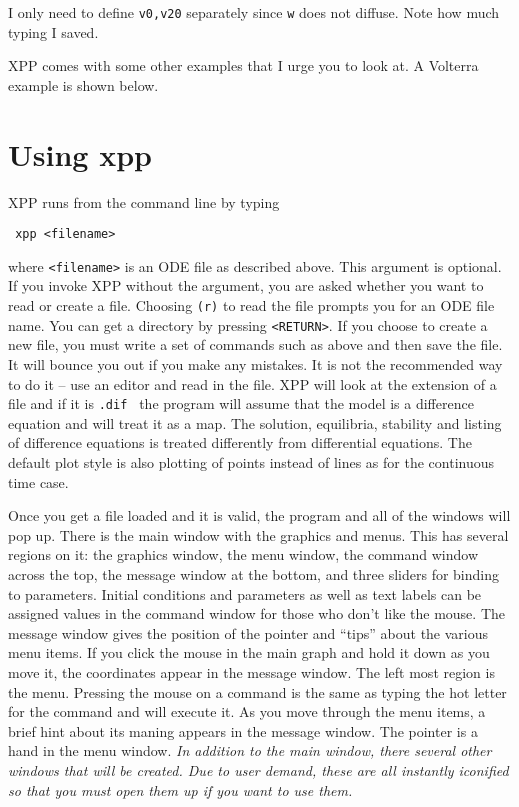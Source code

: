 \documentclass{article}
\newcommand{\bvb}{\begin{verbatim}}
\newcommand{\tc}[1]{\addcontentsline{toc}{subsection}{#1}}
\newcommand{\tcc}[1]{\addcontentsline{toc}{subsubsection}{#1}}
\begin{document}
I only need to define {\tt v0,v20} separately since {\tt w} does not diffuse.
Note how much typing I saved.  




\bigskip











 
  
XPP comes with some other examples that I urge you to look at. A
Volterra example is shown below.

\section{Using xpp}
XPP runs from the command line by typing
\bvb
 xpp <filename>
\end{verbatim}
where {\tt <filename>} is an ODE file as described above.  This argument is optional. 
 If you invoke XPP without the argument, you are asked whether you want to
 read or create a file. Choosing {\tt (r)} to read the file prompts you for an ODE
 file name.  You can get a directory by pressing {\tt <RETURN>}.  If you choose to 
create a new file, you must write a set of commands such as above and then
 save the file.  	It will bounce you out if you make any mistakes. 
 It is not the recommended way to do it -- use an editor and read in the file. 
 XPP will look at the extension of a file and if it is {\tt .dif } the program
 will assume that the model is a difference equation and will treat it as a map. 
 The solution, equilibria, stability and listing of difference equations 
is treated differently from differential equations.  The default plot style 
is also plotting of points instead of lines as for the continuous time case.

\tc{Windows}
\tcc{Main Window}

Once you get a file loaded and it is valid, the program and all of the 
windows will pop up.  There is the main window with the graphics and menus.  
This has several regions on it: the graphics window, the menu window, the command
 window across the top, the message window at the bottom, and three
sliders for binding to parameters.  Initial 
conditions and parameters as well as text labels can be assigned
values in the command window for those who don't like the mouse.  The message 
window gives the position of the pointer and ``tips'' about the
various menu items.  If 
you click the mouse in the main graph and hold it down as you move it, the
coordinates appear in the message window.  The left 
most region is the menu.  Pressing the mouse on a command is the same 
as typing the hot letter for the command and will execute it.  As you
move through the menu items, a brief hint about its maning appears in
the message window. The pointer is 
a hand in the menu window.  {\em In addition to the main window, there
several other windows that will be created.  Due to user demand, these
are all instantly iconified so that you must open them up if you want
to use them.}
\end{document}
